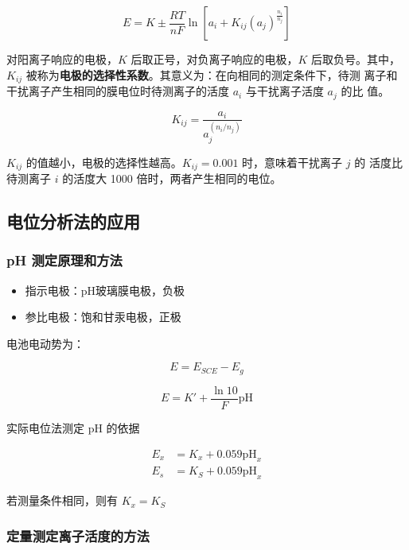 \begin{equation}
    E = K \pm \frac{RT}{nF} \ln \left[ a_i + K_{ij} (a_j)^{\frac{n_i}{n_j}}
        \right]
\end{equation}


对阳离子响应的电极，$K$ 后取正号，对负离子响应的电极，$K$ 后取负号。其中，
$K_{ij}$ 被称为\textbf{电极的选择性系数}。其意义为：在向相同的测定条件下，待测
离子和干扰离子产生相同的膜电位时待测离子的活度 $a_i$ 与干扰离子活度 $a_j$ 的比
值。

\begin{equation}
    K_{ij} = \frac{a_i}{a_j^{(n_i/n_j)}}
\end{equation}


$K_{ij}$ 的值越小，电极的选择性越高。$K_{ij} = 0.001$ 时，意味着干扰离子 $j$ 的
活度比待测离子 $i$ 的活度大 1000 倍时，两者产生相同的电位。

\subsection{电位分析法的应用}

\subsubsection{pH 测定原理和方法}

\begin{itemize}
    \item 指示电极：pH玻璃膜电极，负极
    \item 参比电极：饱和甘汞电极，正极
\end{itemize}

电池电动势为：

\begin{equation}
    E = E_{SCE} - E_{g}
\end{equation}

\begin{equation}
    E = K' + \frac{\ln 10}{F}\mathrm{pH}
\end{equation}

实际电位法测定 pH 的依据

\begin{align}
    E_x & = K_x + 0.059 \mathrm{pH}_x \\
    E_s & = K_S + 0.059 \mathrm{pH}_x
\end{align}

若测量条件相同，则有 $K_x = K_S$

\subsubsection{定量测定离子活度的方法}

